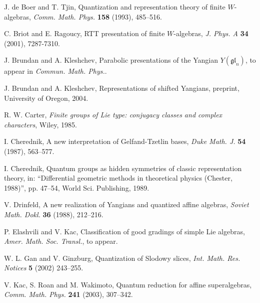 \documentclass[twoside,12pt,reqno]{amsart}
\makeatletter
\newif\ifcenters@
\makeatother
\begin{document}
\begin{thebibliography}{GKLLRT}
\parskip -0.5mm

J. de Boer and T. Tjin,
Quantization and representation theory of finite $W$-algebras,
{\em Comm. Math. Phys.} {\bf 158} (1993), 485--516.

C. Briot and E. Ragoucy,
RTT presentation of finite $W$-algebras,
{\em J. Phys. A} {\bf 34} (2001), 7287-7310.

J. Brundan and A. Kleshchev, Parabolic presentations of the Yangian
$Y(\mathfrak{gl}_n)$, to appear in {\em Commun. Math. Phys.}.

J. Brundan and A. Kleshchev,
Representations of shifted Yangians,
preprint, University of Oregon, 2004.

R. W. Carter,
{\em Finite groups of Lie type: conjugacy classes and complex characters},
Wiley, 1985.

\ifcenters@
\bibitem[CL]{CL}
R.~W. Carter and G. Lusztig, On the modular representations of the general
  linear and symmetric groups, {\em Math. Z.} {\bf 136} (1974), 193--242.
\fi

I. Cherednik,
A new interpretation of Gelfand-Tzetlin bases,
{\em Duke Math. J.} {\bf 54} (1987), 563--577.

I. Cherednik,
Quantum groups as hidden symmetries of classic representation theory,
in:
``Differential geometric methods in theoretical physics (Chester, 1988)'', 
pp. 47--54, World Sci. Publishing, 1989.

V. Drinfeld,
A new realization of Yangians and quantized affine algebras,
{\em Soviet Math. Dokl.} {\bf 36} (1988), 212--216.

P. Elashvili and V. Kac,
Classification of good gradings of simple Lie algebras,
{\em Amer. Math. Soc. Transl.},
to appear.

W. L. Gan and V. Ginzburg,
Quantization of Slodowy slices,
{\em Int. Math. Res. Notices} {\bf 5} (2002) 243--255. 

\ifcenters@
\bibitem[HU]{HU}
R. Howe and T. Umeda,
The Capelli identity, the double commutant theorem and multiplicity-free
actions,
{\em Math. Ann.} {\bf 290} (1991), 569--619.
\fi

V. Kac, S. Roan and M.
Wakimoto,
Quantum reduction for affine superalgebras,
{\em Comm. Math. Phys.} {\bf 241} (2003), 307--342.


\end{thebibliography}
\end{document}
